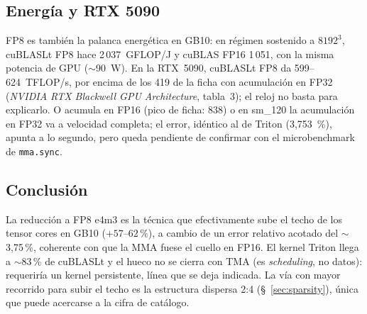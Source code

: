 \subsection{Energía y RTX 5090}

FP8 es también la palanca energética en GB10: en régimen sostenido a $8192^3$, cuBLASLt FP8
hace 2\,037~GFLOP/J y cuBLAS FP16 1\,051, con la misma potencia de GPU ($\sim$90~W). En la
RTX~5090, cuBLASLt FP8 da 599--624~TFLOP/s, por encima de los 419 de la ficha con acumulación
en FP32 (\emph{NVIDIA RTX Blackwell GPU Architecture}, tabla~3); el reloj no basta para explicarlo. O acumula en FP16 (pico de
ficha: 838) o en sm\_120 la acumulación en FP32 va a velocidad completa; el error, idéntico al
de Triton (3{,}753~\%), apunta a lo segundo, pero queda pendiente de confirmar con el
microbenchmark de \texttt{mma.sync}.

\subsection{Conclusión}

La reducción a FP8 e4m3 es la técnica que efectivamente sube el techo de los tensor
cores en GB10 ($+57$--$62\,\%$), a cambio de un error relativo acotado del $\sim$3{,}75\,\%,
coherente con que la MMA fuese el cuello en FP16. El kernel Triton llega a $\sim$83\,\% de
cuBLASLt y el hueco no se cierra con TMA (es \emph{scheduling}, no datos): requeriría un
kernel persistente, línea que se deja indicada. La vía con mayor recorrido para subir el
techo es la estructura dispersa 2:4 (§~\ref{sec:sparsity}), única que puede acercarse a la
cifra de catálogo.
